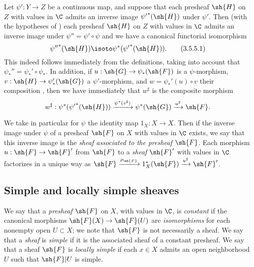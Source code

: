 \begin{env}[3.5.5]
\label{0.3.5.5}
Let $\psi':Y\to Z$ be a continuous map, and suppose that each presheaf $\sh{H}$
on $Z$ with values in $\C$ admits an inverse image ${\psi'}^*(\sh{H})$ under
$\psi'$. Then (with the hypotheses of ) each presheaf $\sh{H}$
on $Z$ with values in $\C$ admits an inverse image under $\psi''=\psi'\circ\psi$
and we have a canonical functorial isomorphism
\[
  {\psi''}^*(\sh{H})\isoto\psi^*({\psi'}^*(\sh{H})).
  \tag{3.5.5.1}
\]
This indeed follows immediately from the definitions, taking into account that
$\psi_*''=\psi_*'\circ\psi_*$. In addition, if $u:\sh{G}\to\psi_*(\sh{F})$ is a
$\psi$-morphism, $v:\sh{H}\to\psi_*'(\sh{G})$ a $\psi'$-morphism, and
$w=\psi_*'(u)\circ v$ their composition , then we have
immediately that $w^\sharp$ is the composite morphism
\[
  w^\sharp:\psi^*({\psi'}^*(\sh{H}))\xrightarrow{\psi^*(v^\sharp)}\psi^*(\sh{G})\xrightarrow{u^\sharp}\sh{F}.
\]
\end{env}

\begin{env}[3.5.6]
\label{0.3.5.6}
We take in particular for $\psi$ the identity map $1_X:X\to X$. Then if the
inverse image under $\psi$ of a presheaf $\sh{F}$ on $X$ with values in $\C$
exists, we say that this inverse image is the \emph{sheaf associated to the
presheaf $\sh{F}$}. Each morphism $u:\sh{F}\to\sh{F}'$ from $\sh{F}$ to a
\emph{sheaf} $\sh{F}'$ with values in $\C$ factorizes in a unique way as
$\sh{F}\xrightarrow{\rho_\sh{F}}1_X^*(\sh{F})\xrightarrow{u^\sharp}\sh{F}'$.
\end{env}

\subsection{Simple and locally simple sheaves}
\label{subsection:simple-and-locally-simple-sheaves}

\begin{env}[3.6.1]
\label{0.3.6.1}
We say that a \emph{presheaf} $\sh{F}$ on $X$, with values in $\C$, is
\emph{constant} if the canonical morphisms $\sh{F}(X)\to\sh{F}(U)$ are
\emph{isomorphisms} for each nonempty open $U\subset X$; we note that $\sh{F}$
is not necessarily a sheaf. We say that a \emph{sheaf} is \emph{simple} if it is
the associated sheaf  of a constant presheaf. We say that a
sheaf $\sh{F}$ is \emph{locally simple} if each $x\in X$ admits an open
neighborhood $U$ such that $\sh{F}|U$ is simple.
\end{env}

